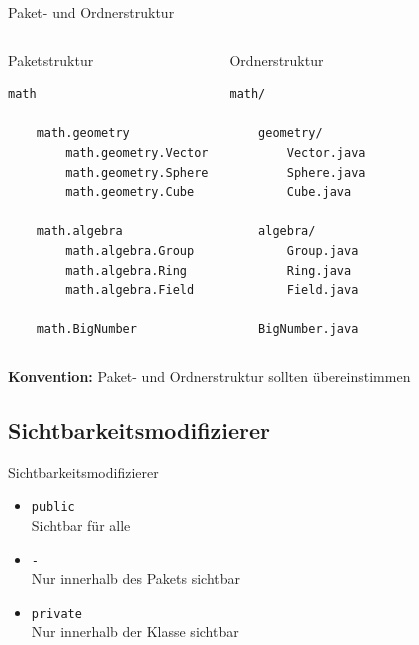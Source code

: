 \documentclass[18pt]{beamer}
\begin{document}
\begin{frame}[fragile]{Paket- und Ordnerstruktur}

    \begin{columns}[c]

        \begin{exampleblock}{Paketstruktur}
            \begin{lstlisting}[basicstyle=\scriptsize]
math

    math.geometry
        math.geometry.Vector
        math.geometry.Sphere
        math.geometry.Cube

    math.algebra
        math.algebra.Group
        math.algebra.Ring
        math.algebra.Field

    math.BigNumber
            \end{lstlisting}

        \end{exampleblock}

        \begin{exampleblock}{Ordnerstruktur}
            \begin{lstlisting}[basicstyle=\scriptsize]
math/

    geometry/
        Vector.java
        Sphere.java
        Cube.java

    algebra/
        Group.java
        Ring.java
        Field.java

    BigNumber.java
            \end{lstlisting}
        \end{exampleblock}

    \end{columns}

    \vspace{.2in}

    \textbf{Konvention:} Paket- und Ordnerstruktur sollten übereinstimmen

\end{frame}



\subsection{Sichtbarkeitsmodifizierer}

\begin{frame}{Sichtbarkeitsmodifizierer}

    \begin{itemize}
        \item \texttt{public}\\ Sichtbar für alle
        \item \texttt{-}\\ Nur innerhalb des Pakets sichtbar
        \item \texttt{private}\\ Nur innerhalb der Klasse sichtbar
    \end{itemize}
\end{frame}
\end{document}
